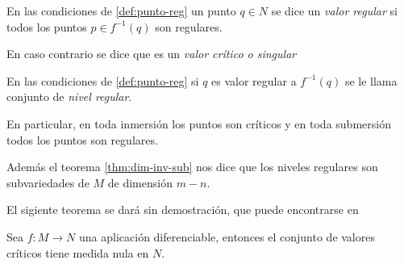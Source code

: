 \documentclass[../VD.tex]{subfiles}
\begin{document}
\begin{definition}
En las condiciones de \cref{def:punto-reg} un punto \(q\in N\) se dice un \emph{valor regular} si todos los puntos \(p\in f^{-1}(q)\) son regulares.

En caso contrario se dice que es un \emph{valor crítico o singular}
\end{definition}

\begin{definition}
En las condiciones de \cref{def:punto-reg} si \(q\) es valor regular a \(f^{-1}(q)\) se le llama conjunto de \emph{nivel regular}.
\end{definition}

\begin{remark}
En particular, en toda inmersión los puntos son críticos y en toda submersión todos los puntos son regulares.

Además el teorema \ref{thm:dim-inv-sub}
nos dice que los niveles regulares son subvariedades de \(M\) de dimensión \(m-n\).
\end{remark}

El sigiente teorema se dará sin demostración, que puede encontrarse en %

\begin{theorem}%
Sea \(f\colon M\to N\) una aplicación diferenciable, entonces el conjunto de valores críticos tiene medida nula en \(N\).
\end{theorem}
\end{document}
